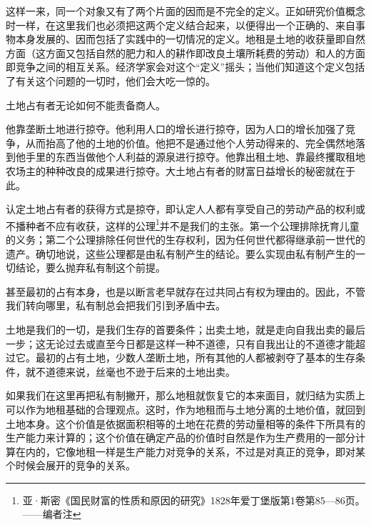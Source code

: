 \documentclass[a4paper,twoside,12pt,AutoFakeBold]{ctexart}
\begin{document}
这样一来，同一个对象又有了两个片面的因而是不完全的定义。正如研究价值概念时一样，在这里我们也必须把这两个定义结合起来，以便得出一个正确的、来自事物本身发展的、因而包括了实践中的一切情况的定义。地租是土地的收获量即自然方面（这方面又包括自然的肥力和人的耕作即改良土壤所耗费的劳动）和人的方面即竞争之间的相互关系。经济学家会对这个“定义”摇头；当他们知道这个定义包括了有关这个问题的一切时，他们会大吃一惊的。

土地占有者无论如何不能责备商人。

他靠垄断土地进行掠夺。他利用人口的增长进行掠夺，因为人口的增长加强了竞争，从而抬高了他的土地的价值。他把不是通过他个人劳动得来的、完全偶然地落到他手里的东西当做他个人利益的源泉进行掠夺。他靠出租土地、靠最终攫取租地农场主的种种改良的成果进行掠夺。大土地占有者的财富日益增长的秘密就在于此。

认定土地占有者的获得方式是掠夺，即认定人人都有享受自己的劳动产品的权利或不播种者不应有收获，这样的公理\footnote{亚·斯密《国民财富的性质和原因的研究》1828年爱丁堡版第1卷第85—86页。——编者注}并不是我们的主张。第一个公理排除抚育儿童的义务；第二个公理排除任何世代的生存权利，因为任何世代都得继承前一世代的遗产。确切地说，这些公理都是由私有制产生的结论。要么实现由私有制产生的一切结论，要么抛弃私有制这个前提。

甚至最初的占有本身，也是以断言老早就存在过共同占有权为理由的。因此，不管我们转向哪里，私有制总会把我们引到矛盾中去。

土地是我们的一切，是我们生存的首要条件；出卖土地，就是走向自我出卖的最后一步；这无论过去或直至今日都是这样一种不道德，只有自我出让的不道德才能超过它。最初的占有土地，少数人垄断土地，所有其他的人都被剥夺了基本的生存条件，就不道德来说，丝毫也不逊于后来的土地出卖。

如果我们在这里再把私有制撇开，那么地租就恢复它的本来面目，就归结为实质上可以作为地租基础的合理观点。这时，作为地租而与土地分离的土地价值，就回到土地本身。这个价值是依据面积相等的土地在花费的劳动量相等的条件下所具有的生产能力来计算的；这个价值在确定产品的价值时自然是作为生产费用的一部分计算在内的，它像地租一样是生产能力对竞争的关系，不过是对真正的竞争，即对某个时候会展开的竞争的关系。
\end{document}
